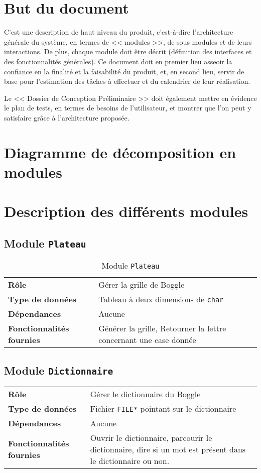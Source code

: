 \documentclass[12pt,a4paper,openany]{article}
\begin{document}
	\setcounter{tocdepth}{2}
	\setcounter{secnumdepth}{3}
	\maketitle
	\tableofcontents
	\newpage
	\section{But du document}
	C'est une description de haut niveau du produit, c'est-à-dire l'architecture générale du système, en termes de << modules >>, de sous modules et de leurs
	interactions. De plus, chaque module doit être décrit (définition des interfaces et des fonctionnalités générales). Ce document doit en premier lieu asseoir
	la confiance en la finalité et la faisabilité du produit, et, en second lieu, servir de base pour l'estimation des tâches à effectuer et du calendrier de
	leur réalisation.

	Le << Dossier de Conception Préliminaire >> doit également mettre en évidence le plan de tests, en termes de besoins de l'utilisateur, et montrer que l'on peut
	y satisfaire grâce à l'architecture proposée.
	\section{Diagramme de décomposition en modules}
	\section{Description des différents modules}
		\subsection{Module \texttt{Plateau}}
		\begin{table}[H]
			\centering
		\begin{tabular}{p{5cm} p{12cm}}
			\textbf{Rôle} & Gérer la grille de Boggle\\
			\textbf{Type de données} & Tableau à deux dimensions de \texttt{char} \\
			\textbf{Dépendances} & Aucune \\
			\textbf{Fonctionnalités fournies} & Générer la grille, Retourner la lettre concernant une case donnée\\
		\end{tabular}
		\caption{Module \texttt{Plateau}}
	\end{table}
		\subsection{Module \texttt{Dictionnaire}}
		\begin{tabular}{p{5cm} p{12cm}}
			\textbf{Rôle} & Gérer le dictionnaire du Boggle\\
			\textbf{Type de données} & Fichier \texttt{FILE*} pointant sur le dictionnaire\\
			\textbf{Dépendances} & Aucune\\
			\textbf{Fonctionnalités fournies} & Ouvrir le dictionnaire, parcourir le dictionnaire, dire si un mot est présent dans le dictionnaire ou non. 
		\end{tabular}
\end{document}
